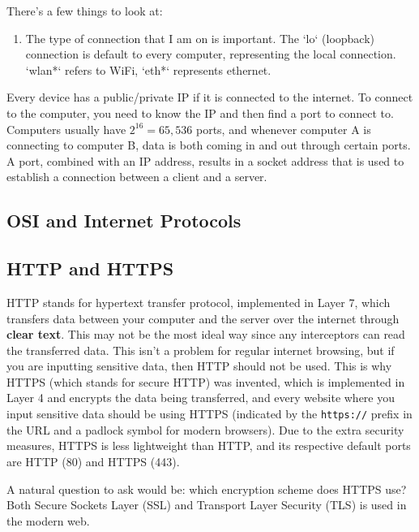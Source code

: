 \documentclass{article}
\begin{document}
    There's a few things to look at: 
    \begin{enumerate}
      \item The type of connection that I am on is important. The `lo` (loopback) connection is default to every computer, representing the local connection. `wlan*` refers to WiFi, `eth*` represents ethernet. 

    \end{enumerate}

    Every device has a public/private IP if it is connected to the internet. To connect to the computer, you need to know the IP and then find a port to connect to. Computers usually have $2^{16} = 65,536$ ports, and whenever computer A is connecting to computer B, data is both coming in and out through certain ports. A port, combined with an IP address, results in a socket address that is used to establish a connection between a client and a server. 

  \subsection{OSI and Internet Protocols}

  

  \subsection{HTTP and HTTPS} 

    HTTP stands for hypertext transfer protocol, implemented in Layer 7, which transfers data between your computer and the server over the internet through \textbf{clear text}. This may not be the most ideal way since any interceptors can read the transferred data. This isn't a problem for regular internet browsing, but if you are inputting sensitive data, then HTTP should not be used. This is why HTTPS (which stands for secure HTTP) was invented, which  is implemented in Layer 4 and encrypts the data being transferred, and every website where you input sensitive data should be using HTTPS (indicated by the \texttt{https://} prefix in the URL and a padlock symbol for modern browsers). Due to the extra security measures, HTTPS is less lightweight than HTTP, and its respective default ports are HTTP (80) and HTTPS (443).  

    A natural question to ask would be: which encryption scheme does HTTPS use? Both Secure Sockets Layer (SSL) and Transport Layer Security (TLS) is used in the modern web. 
\end{document}
